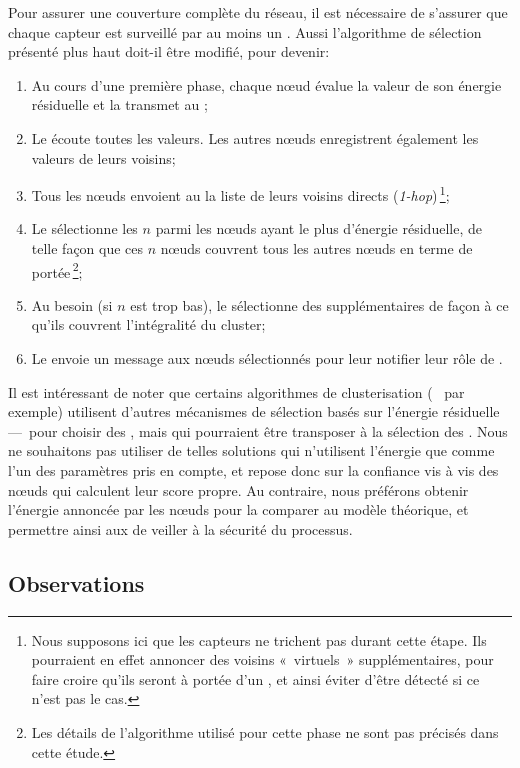 Pour assurer une couverture complète du réseau, il est nécessaire de s'assurer que chaque capteur est surveillé par au moins un \cn.
Aussi l'algorithme de sélection présenté plus haut doit-il être modifié, pour devenir:
\begin{enumerate}
    \item Au cours d'une première phase, chaque nœud évalue la valeur de son énergie résiduelle et la transmet au \ch;
    \item Le \ch écoute toutes les valeurs. Les autres nœuds enregistrent également les valeurs de leurs voisins;
    \item Tous les nœuds envoient au \CH la liste de leurs voisins directs (\textit{1-hop})\,\footnote{Nous supposons ici que les capteurs ne trichent pas durant cette étape. Ils pourraient en effet annoncer des voisins « virtuels » supplémentaires, pour faire croire qu'ils seront à portée d'un \cn, et ainsi éviter d'être détecté si ce n'est pas le cas.};
    \item Le \CH sélectionne les $n$ \cns parmi les nœuds ayant le plus d'énergie résiduelle, de telle façon que ces $n$ nœuds couvrent tous les autres nœuds en terme de portée\,\footnote{Les détails de l'algorithme utilisé pour cette phase ne sont pas précisés dans cette étude.};
    \item Au besoin (si $n$ est trop bas), le \CH sélectionne des \cns supplémentaires de façon à ce qu'ils couvrent l'intégralité du cluster;
    \item Le \CH envoie un message aux nœuds sélectionnés pour leur notifier leur rôle de \cn.
\end{enumerate}

Il est intéressant de noter que certains algorithmes de clusterisation (\heed~\cite{YF04} par exemple) utilisent d'autres mécanismes de sélection basés sur l'énergie résiduelle ---~pour choisir des \chs, mais qui pourraient être transposer à la sélection des \cns.
Nous ne souhaitons pas utiliser de telles solutions qui n'utilisent l'énergie que comme l'un des paramètres pris en compte, et repose donc sur la confiance vis à vis des nœuds qui calculent leur score propre.
Au contraire, nous préférons obtenir l'énergie annoncée par les nœuds pour la comparer au modèle théorique, et permettre ainsi aux \vns de veiller à la sécurité du processus.

    \subsection{Observations}

